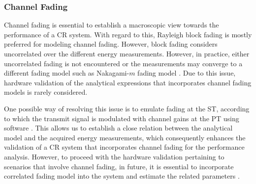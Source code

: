 
\subsubsection{Channel Fading}
Channel fading is essential to establish a macroscopic view towards the performance of a CR system. With regard to this, Rayleigh block fading is mostly preferred for modeling channel fading. However, block fading considers uncorrelated over the different energy measurements. However, in practice, either uncorrelated fading is not encountered or the measurements may converge to a different fading model such as Nakagami-$m$ fading model \cite{Kaushik14_CC}. Due to this issue, hardware validation of the analytical expressions that incorporates channel fading models is rarely considered. %

One possible way of resolving this issue is to emulate fading at the ST, according to which the transmit signal is modulated with channel gains at the PT using software \cite{Kaushik16_VTC2}. This allows us to establish a close relation between the analytical model and the acquired energy measurements, which consequently enhances the validation of a CR system that incorporates channel fading for the performance analysis. However, to proceed with the hardware validation pertaining to scenarios that involve channel fading, in future, it is essential to incorporate correlated fading model into the system and estimate the related parameters \cite{Kaushik14_CC}. 

